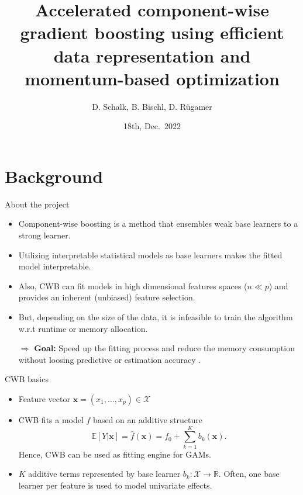 \documentclass[ignorenonframetext,]{beamer}
\title{Accelerated component-wise gradient boosting using efficient data
representation and momentum-based optimization}
\author{D. Schalk, B. Bischl, D. Rügamer}
\date{18th, Dec.~2022}
\providecommand{\tightlist}{%
  \setlength{\itemsep}{0pt}\setlength{\parskip}{0pt}}
\newcommand{\fh}{\hat{f}}
\begin{document}
\begin{frame}[plain]
\titlepage
\end{frame}


\hypertarget{background}{%
\section{Background}\label{background}}

\begin{frame}{About the project}
\protect\hypertarget{about-the-project}{}
\begin{itemize}
\tightlist
\item
  Component-wise boosting
  \citep[CWB;][]{buhlmann2003boosting,buhlmann2007boosting} is a method
  that ensembles weak base learners to a strong learner.
\item
  Utilizing interpretable statistical models as base learners makes the
  fitted model interpretable.
\item
  Also, CWB can fit models in high dimensional features spaces
  (\(n \ll p\)) and provides an inherent (unbiased) feature selection.
\item
  But, depending on the size of the data, it is infeasible to train the
  algorithm w.r.t runtime or memory allocation.
\end{itemize}

\begin{itemize}
\item[$\Rightarrow$] \textbf{Goal:} Speed up the fitting process and reduce the memory consumption without loosing predictive or estimation accuracy \citep{schalk2022accelerated}.
\end{itemize}
\end{frame}

\begin{frame}{CWB basics}
\protect\hypertarget{cwb-basics}{}
\begin{itemize}
\tightlist
\item
  Feature vector \(\bm{x} = (x_1, \dots, x_p)\in\mathcal{X}\)
\item
  CWB fits a model \(\fh\) based on an additive structure
  \[\mathbb{E}[Y|\bm{x}] = \fh(\bm{x}) = f_0 + \sum_{k=1}^K b_k(\bm{x}).\]
  Hence, CWB can be used as fitting engine for GAMs.
\item
  \(K\) additive terms represented by base learner
  \(b_k : \mathcal{X} \to \mathbb{R}\). Often, one base learner per
  feature is used to model univariate effects.
\end{itemize}
\end{frame}
\end{document}
